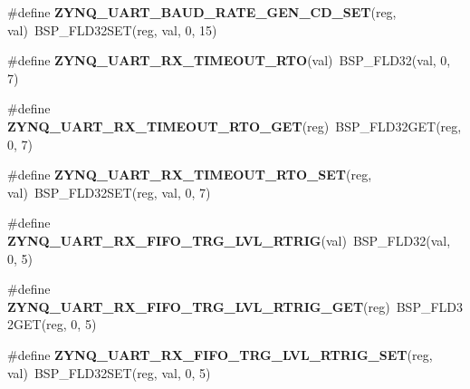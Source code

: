 \begin{DoxyCompactItemize}
\item 
\mbox{\label{zynq-uart-regs_8h_a8424b6998ff54a73efb119f148cd049c}} 
\#define {\bfseries Z\+Y\+N\+Q\+\_\+\+U\+A\+R\+T\+\_\+\+B\+A\+U\+D\+\_\+\+R\+A\+T\+E\+\_\+\+G\+E\+N\+\_\+\+C\+D\+\_\+\+S\+ET}(reg,  val)~B\+S\+P\+\_\+\+F\+L\+D32\+S\+ET(reg, val, 0, 15)
\item 
\mbox{\label{zynq-uart-regs_8h_a66007d40aaacedb1ba81f5e82532b22b}} 
\#define {\bfseries Z\+Y\+N\+Q\+\_\+\+U\+A\+R\+T\+\_\+\+R\+X\+\_\+\+T\+I\+M\+E\+O\+U\+T\+\_\+\+R\+TO}(val)~B\+S\+P\+\_\+\+F\+L\+D32(val, 0, 7)
\item 
\mbox{\label{zynq-uart-regs_8h_a013f7d2becfdbd135e1d86c20f82cc23}} 
\#define {\bfseries Z\+Y\+N\+Q\+\_\+\+U\+A\+R\+T\+\_\+\+R\+X\+\_\+\+T\+I\+M\+E\+O\+U\+T\+\_\+\+R\+T\+O\+\_\+\+G\+ET}(reg)~B\+S\+P\+\_\+\+F\+L\+D32\+G\+ET(reg, 0, 7)
\item 
\mbox{\label{zynq-uart-regs_8h_a7b8f13762827c8ec848503529675c7ce}} 
\#define {\bfseries Z\+Y\+N\+Q\+\_\+\+U\+A\+R\+T\+\_\+\+R\+X\+\_\+\+T\+I\+M\+E\+O\+U\+T\+\_\+\+R\+T\+O\+\_\+\+S\+ET}(reg,  val)~B\+S\+P\+\_\+\+F\+L\+D32\+S\+ET(reg, val, 0, 7)
\item 
\mbox{\label{zynq-uart-regs_8h_a6c2495e7025cbf6c44f17e7f062040f4}} 
\#define {\bfseries Z\+Y\+N\+Q\+\_\+\+U\+A\+R\+T\+\_\+\+R\+X\+\_\+\+F\+I\+F\+O\+\_\+\+T\+R\+G\+\_\+\+L\+V\+L\+\_\+\+R\+T\+R\+IG}(val)~B\+S\+P\+\_\+\+F\+L\+D32(val, 0, 5)
\item 
\mbox{\label{zynq-uart-regs_8h_a2fbb84b70f301596e9e18cfc3d1c1197}} 
\#define {\bfseries Z\+Y\+N\+Q\+\_\+\+U\+A\+R\+T\+\_\+\+R\+X\+\_\+\+F\+I\+F\+O\+\_\+\+T\+R\+G\+\_\+\+L\+V\+L\+\_\+\+R\+T\+R\+I\+G\+\_\+\+G\+ET}(reg)~B\+S\+P\+\_\+\+F\+L\+D32\+G\+ET(reg, 0, 5)
\item 
\mbox{\label{zynq-uart-regs_8h_ae4234e57cc2ace04a7c74436f4ca841b}} 
\#define {\bfseries Z\+Y\+N\+Q\+\_\+\+U\+A\+R\+T\+\_\+\+R\+X\+\_\+\+F\+I\+F\+O\+\_\+\+T\+R\+G\+\_\+\+L\+V\+L\+\_\+\+R\+T\+R\+I\+G\+\_\+\+S\+ET}(reg,  val)~B\+S\+P\+\_\+\+F\+L\+D32\+S\+ET(reg, val, 0, 5)
\item 
\mbox{\label{zynq-uart-regs_8h_a7b49e943ef056930466bd4845afac75e}} 

\end{DoxyCompactItemize}
